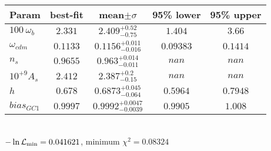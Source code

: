 \begin{tabular}{|l|c|c|c|c|} 
 \hline 
Param & best-fit & mean$\pm\sigma$ & 95\% lower & 95\% upper \\ \hline 
$100~\omega_{b }$ &$2.331$ & $2.409_{-0.75}^{+0.52}$ & $1.404$ & $3.66$ \\ 
$\omega_{cdm }$ &$0.1133$ & $0.1156_{-0.016}^{+0.011}$ & $0.09383$ & $0.1414$ \\ 
$n_{s }$ &$0.9655$ & $0.963_{-0.011}^{+0.014}$ & $nan$ & $nan$ \\ 
$10^{+9}A_{s }$ &$2.412$ & $2.387_{-0.15}^{+0.2}$ & $nan$ & $nan$ \\ 
$h$ &$0.678$ & $0.6873_{-0.064}^{+0.045}$ & $0.5964$ & $0.7948$ \\ 
$bias_{GC 1 }$ &$0.9997$ & $0.9992_{-0.0039}^{+0.0047}$ & $0.9905$ & $1.008$ \\ 
\hline 
 \end{tabular} \\ 
$-\ln{\cal L}_\mathrm{min} =0.041621$, minimum $\chi^2=0.08324$ \\ 

